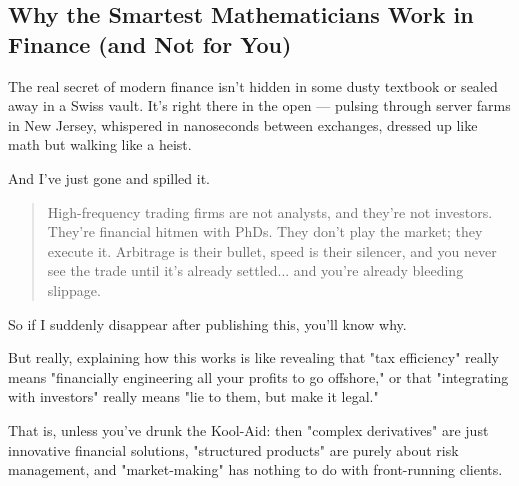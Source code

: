 \subsection{Why the Smartest Mathematicians Work in Finance (and Not for You)}

The real secret of modern finance isn’t hidden in some dusty textbook or sealed away in a Swiss vault. It’s right there in the open — pulsing through server farms in New Jersey, whispered in nanoseconds between exchanges, dressed up like math but walking like a heist.

And I’ve just gone and spilled it.

\begin{quote}
High-frequency trading firms are not analysts, and they’re not investors. They’re financial hitmen with PhDs. They don’t play the market; they execute it. Arbitrage is their bullet, speed is their silencer, and you never see the trade until it’s already settled... and you’re already bleeding slippage.
\end{quote}

So if I suddenly disappear after publishing this, you'll know why. 

But really, explaining how this works is like revealing that "tax efficiency" really means "financially engineering all your profits to go offshore," or that "integrating with investors" really means "lie to them, but make it legal."

That is, unless you’ve drunk the Kool-Aid: then "complex derivatives" are just innovative financial solutions, "structured products" are purely about risk management, and "market-making" has nothing to do with front-running clients.

